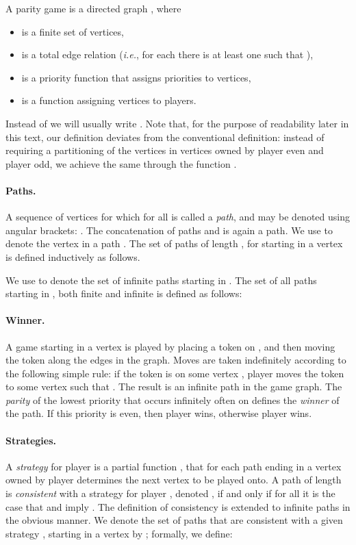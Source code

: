 \documentclass[a4paper]{llncs}
\newcommand{\ie}{\textit{i.e.}\xspace}
\begin{document}
\begin{definition}
A parity game  is a directed graph ,
where 
\begin{itemize}
\item  is a finite set of vertices,
\item  is a total edge relation (\ie, for each
 there is at least one  such that ),

\item  is a priority function that assigns priorities to vertices,

\item  is a function assigning vertices
to players.

\end{itemize}
\end{definition}
Instead of  we will usually write .  Note that,
for the purpose of readability later in this text, our definition
deviates from the conventional definition: instead of requiring a
partitioning of the vertices  in vertices owned by player even 
and player odd, we achieve the same
through the function . 

\paragraph{Paths.} A sequence of vertices  for which
 for all  is called a \emph{path}, and
may be denoted using angular brackets: . The
concatenation  of paths  and  is again a path. We
use  to denote the  vertex in a path . The set of
paths of length , for  starting in a vertex  is defined
inductively as follows.

We use  to denote the set of infinite paths
starting in . The set of all paths starting in , both finite and
infinite is defined as follows:

\paragraph{Winner.} A game starting in a vertex  is played by
placing a token on , and then moving the token along the edges in the
graph. Moves are taken indefinitely according to the following simple
rule: if the token is on some vertex , player  moves
the token to some vertex  such that . The result is an
infinite path  in the game graph.  The \emph{parity} of the lowest
priority that occurs infinitely often on  defines the \emph{winner}
of the path. If this priority is even, then player  wins, otherwise
player  wins.

\paragraph{Strategies.} A \emph{strategy} for player  is
a partial function , that for each path ending in a
vertex owned by player  determines the next vertex to be played
onto. A path  of length  is \emph{consistent} with a strategy 
for player , denoted , if and only if
for all  it is the case that  and  imply . The definition of consistency is extended
to infinite paths in the obvious manner. We denote the set of paths that 
are consistent with a given strategy , starting in a vertex  by
; formally, we define:
\end{document}
